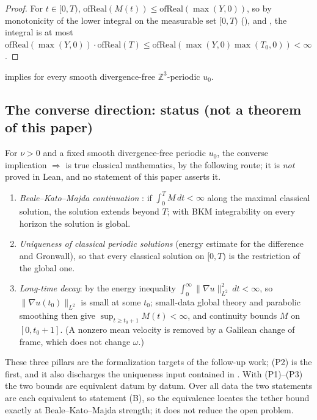 \begin{proof}
For $t\in[0,T)$, $\mathrm{ofReal}(M(t))\le\mathrm{ofReal}(\max(Y,0))$, so by monotonicity of the lower
integral on the measurable set $[0,T)$ (),  and
, the integral is at most $\mathrm{ofReal}(\max(Y,0))\cdot\mathrm{ofReal}(T)\le
\mathrm{ofReal}(\max(Y,0)\max(T_0,0))<\infty$.
\end{proof}

\begin{corollary}
 implies  for every smooth
divergence-free $\mathbb{Z}^3$-periodic $u_0$.
\end{corollary}

\subsection{The converse direction: status (not a theorem of this paper)}\label{sec:converse}
For $\nu>0$ and a fixed smooth divergence-free periodic $u_0$, the converse implication
 $\Rightarrow$  is true classical mathematics,
by the following route; it is \emph{not} proved in Lean, and no statement of this paper asserts it.
\begin{enumerate}[label=(P\arabic*)]
\item \emph{Beale--Kato--Majda continuation} \cite{BKM1984}: if $\int_0^{T}M\,dt<\infty$ along the maximal
classical solution, the solution extends beyond $T$; with BKM integrability on every horizon the solution is
global.
\item \emph{Uniqueness of classical periodic solutions} (energy estimate for the difference and Gronwall), so
that every classical solution on $[0,T)$ is the restriction of the global one.
\item \emph{Long-time decay}: by the energy inequality $\int_0^\infty\|\nabla u\|_{L^2}^2\,dt<\infty$, so
$\|\nabla u(t_0)\|_{L^2}$ is small at some $t_0$; small-data global theory and parabolic smoothing then give
$\sup_{t\ge t_0+1}M(t)<\infty$, and continuity bounds $M$ on $[0,t_0+1]$. (A nonzero mean velocity is removed by
a Galilean change of frame, which does not change $\omega$.)
\end{enumerate}
These three pillars are the formalization targets of the follow-up work; (P2) is the first, and it also discharges
the uniqueness input contained in . With (P1)--(P3) the two bounds are equivalent
datum by datum. Over all data the two statements are each equivalent to statement (B), so the equivalence
locates the tether bound exactly at Beale--Kato--Majda strength; it does not reduce the open problem.

